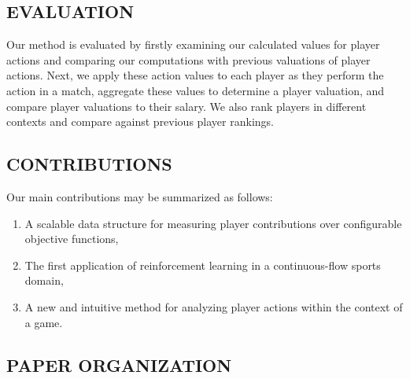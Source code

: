 \documentclass[]{article}
\begin{document}

\subsection{EVALUATION}

Our method is evaluated by firstly examining our calculated values for player actions and comparing our computations with previous valuations of player actions.  Next, we apply these action values to each player as they perform the action in a match, aggregate these values to determine a player valuation, and compare player valuations to their salary. We also rank players in different contexts and compare against previous player rankings.


\subsection{CONTRIBUTIONS}

Our main contributions may be summarized as follows:

\begin{enumerate}
\item A scalable data structure for measuring player contributions over configurable objective functions,
\item The first application of reinforcement learning in a continuous-flow sports domain,
\item A new and intuitive method for analyzing player actions within the context of a game.
\end{enumerate}


\subsection{PAPER ORGANIZATION}
\end{document}
